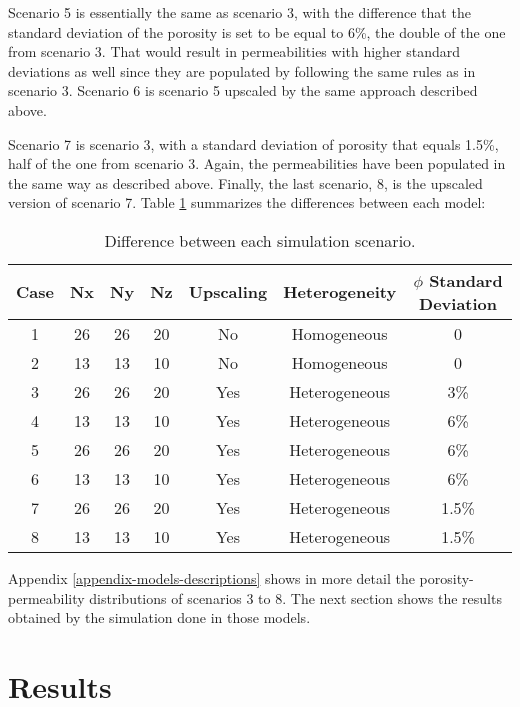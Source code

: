 Scenario 5 is essentially the same as scenario 3, with the difference that the standard deviation of the porosity is set to be equal to 6\%, the double of the one from scenario 3.
%
That would result in permeabilities with higher standard deviations as well since they are populated by following the same rules as in scenario 3.
%
Scenario 6 is scenario 5 upscaled by the same approach described above.

Scenario 7 is scenario 3, with a standard deviation of porosity that equals 1.5\%, half of the one from scenario 3.
%
Again, the permeabilities have been populated in the same way as described above.
%
Finally, the last scenario, 8, is the upscaled version of scenario 7.
%
Table \ref{table-differences-between-simulation-cases} summarizes the differences between each model:
%
\begin{table}[htbp]
	\centering
	\caption{Difference between each simulation scenario.}
	\label{table-differences-between-simulation-cases}
	\begin{tabular}{c c c c c c c}
		\toprule
		Case & Nx & Ny & Nz & Upscaling & Heterogeneity & $\phi$ Standard Deviation\\
		\midrule
		1 & 26 & 26 & 20 & No & Homogeneous & 0\\
		2 & 13 & 13 & 10 & No & Homogeneous & 0\\
		3 & 26 & 26 & 20 & Yes & Heterogeneous & 3\%\\
		4 & 13 & 13 & 10 & Yes & Heterogeneous & 6\%\\
		5 & 26 & 26 & 20 & Yes & Heterogeneous & 6\%\\
		6 & 13 & 13 & 10 & Yes & Heterogeneous & 6\%\\
		7 & 26 & 26 & 20 & Yes & Heterogeneous & 1.5\%\\
		8 & 13 & 13 & 10 & Yes & Heterogeneous & 1.5\%\\
		\bottomrule
	\end{tabular}
\end{table}

Appendix \ref{appendix-models-descriptions} shows in more detail the porosity-permeability distributions of scenarios 3 to 8.
%
The next section shows the results obtained by the simulation done in those models.

\section{Results}

